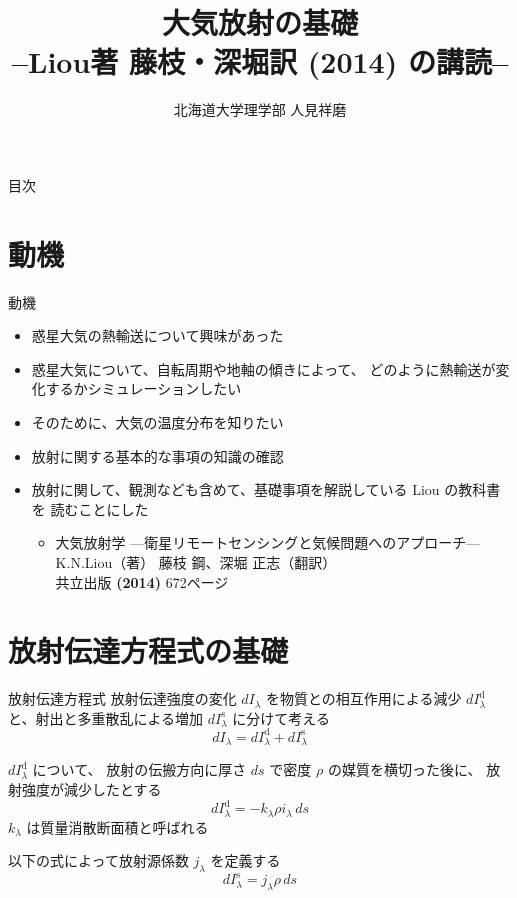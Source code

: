 \documentclass[unicode,colorlinks]{beamer}
\title{大気放射の基礎\\--Liou著 藤枝・深堀訳 (2014) の講読--}
\author{北海道大学理学部 人見祥磨}
\date{\warekitoday}
\begin{document}
\maketitle
\mleftright

\begin{frame}{目次}
	\tableofcontents
\end{frame}

\section{動機}

\begin{frame}{動機}
	\begin{itemize}
		\item 惑星大気の熱輸送について興味があった
		\item 惑星大気について、自転周期や地軸の傾きによって、
			どのように熱輸送が変化するかシミュレーションしたい
		\item そのために、大気の温度分布を知りたい
		\item 放射に関する基本的な事項の知識の確認
		\item 放射に関して、観測なども含めて、基礎事項を解説している Liou の教科書を
			読むことにした
			\begin{itemize}
				\item 大気放射学 {\scriptsize---衛星リモートセンシングと気候問題へのアプローチ---}\\
					K.N.Liou（著） 藤枝 鋼、深堀 正志（翻訳）\\
					共立出版 \textbf{(2014)} 672ページ
			\end{itemize}
	\end{itemize}
\end{frame}

\section{放射伝達方程式の基礎}

\begin{frame}{放射伝達方程式}
	放射伝達強度の変化 $dI_\lambda$ を物質との相互作用による減少
	$dI_\lambda^\mathrm{d}$ と、射出と多重散乱による増加
	$dI_\lambda^\mathrm{s}$ に分けて考える
	\[dI_\lambda=dI_\lambda^\mathrm{d}+dI_\lambda^\mathrm{s}\]

	$dI_\lambda^\mathrm{d}$ について、
	放射の伝搬方向に厚さ $ds$ で密度 $\rho$ の媒質を横切った後に、
	放射強度が減少したとする
	\[dI_\lambda^\mathrm{d}=-k_\lambda\rho i_\lambda\,ds\]
	$k_\lambda$ は質量消散断面積と呼ばれる

	以下の式によって放射源係数 $j_\lambda$ を定義する
	\[dI_\lambda^\mathrm{s}=j_\lambda\rho\,ds\]
\end{frame}
\end{document}
